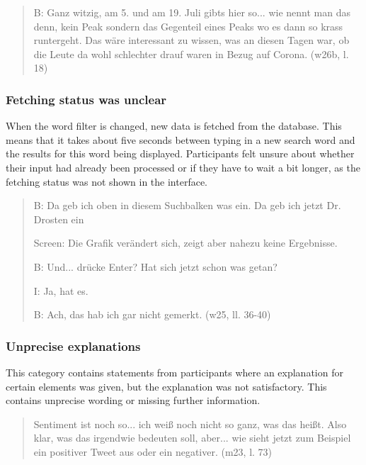 \begin{quote}
    B: Ganz witzig, am 5. und am 19. Juli gibts hier so... wie nennt man das denn, kein Peak sondern das Gegenteil  eines Peaks wo es dann so krass runtergeht. Das wäre interessant zu wissen, was an diesen Tagen war, ob die Leute da wohl schlechter drauf waren in Bezug auf Corona.  (w26b, l. 18)
\end{quote}

\subsubsection*{Fetching status was unclear}
When the word filter is changed, new data is fetched from the database. This means that it takes about five seconds between typing in a new search word and the results for this word being displayed. Participants felt unsure about whether their input had already been processed or if they have to wait a bit longer, as the fetching status was not shown in the interface.

\begin{quote}
    B: Da geb ich oben in diesem Suchbalken was ein. Da geb ich jetzt Dr. Drosten ein

    Screen: Die Grafik verändert sich, zeigt aber nahezu keine Ergebnisse. 

    B: Und... drücke Enter? Hat sich jetzt schon was getan?

    I: Ja, hat es.

    B: Ach, das hab ich gar nicht gemerkt. (w25, ll. 36-40)
\end{quote}

\subsubsection*{Unprecise explanations}
This category contains statements from participants where an explanation for certain elements was given, but the explanation was not satisfactory. This contains unprecise wording or missing further information.

\begin{quote}
    Sentiment ist noch so... ich weiß noch nicht so ganz, was das heißt. Also klar, was das irgendwie bedeuten soll, aber... wie sieht jetzt zum Beispiel ein positiver Tweet aus oder ein negativer. (m23, l. 73)
\end{quote}

